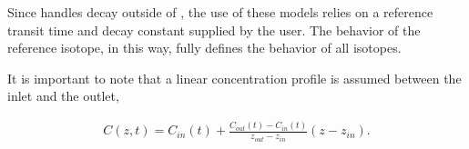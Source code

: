 Since \Cyclus handles decay outside of \Cyder, the use of these models relies on a 
reference transit time and decay constant supplied by the user. The behavior of 
the reference isotope, in this way, fully defines the behavior of all isotopes.

It is important to note that a linear concentration profile is assumed between 
the inlet and the outlet,

\begin{align}
  C(z,t) = C_{in}(t)  + \frac{C_{out}(t) - C_{in}(t)}{z_{out} - z_{in}}(z-z_{in}).
\end{align}

